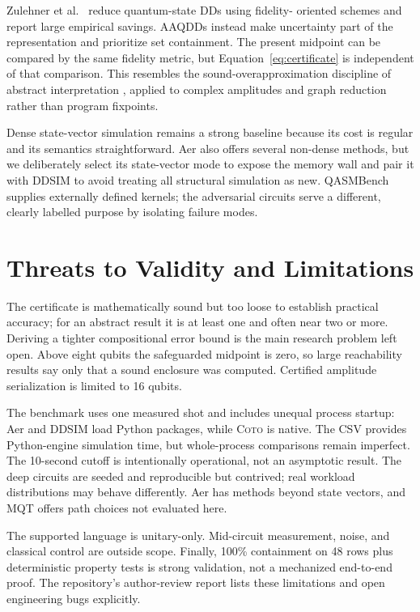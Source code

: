 \documentclass[sigconf,nonacm]{acmart}
\newcommand{\tool}{\textsc{Coto}}
\newcommand{\aaqdd}{AAQDD}
\begin{document}
Zulehner et al.~\cite{zulehner2020approximation} reduce quantum-state DDs using fidelity-
oriented schemes and report large empirical savings. \aaqdd{}s instead make uncertainty part
of the representation and prioritize set containment. The present midpoint can be compared by
the same fidelity metric, but Equation~\ref{eq:certificate} is independent of that comparison.
This resembles the sound-overapproximation discipline of abstract interpretation
\cite{cousot1977abstract}, applied to complex amplitudes and graph reduction rather than
program fixpoints.

Dense state-vector simulation remains a strong baseline because its cost is regular and its
semantics straightforward. Aer also offers several non-dense methods, but we deliberately
select its state-vector mode to expose the memory wall and pair it with DDSIM to avoid treating
all structural simulation as new. QASMBench supplies externally defined kernels; the
adversarial circuits serve a different, clearly labelled purpose by isolating failure modes.

\section{Threats to Validity and Limitations}

The certificate is mathematically sound but too loose to establish practical accuracy; for an
abstract result it is at least one and often near two or more. Deriving a tighter compositional
error bound is the main research problem left open. Above eight qubits the safeguarded midpoint
is zero, so large reachability results say only that a sound enclosure was computed. Certified
amplitude serialization is limited to 16 qubits.

The benchmark uses one measured shot and includes unequal process startup: Aer and DDSIM load
Python packages, while \tool{} is native. The CSV provides Python-engine simulation time, but
whole-process comparisons remain imperfect. The 10-second cutoff is intentionally operational,
not an asymptotic result. The deep circuits are seeded and reproducible but contrived; real
workload distributions may behave differently. Aer has methods beyond state vectors, and MQT
offers path choices not evaluated here.

The supported language is unitary-only. Mid-circuit measurement, noise, and classical control
are outside scope. Finally, 100\% containment on 48 rows plus deterministic property tests is
strong validation, not a mechanized end-to-end proof. The repository's author-review report
lists these limitations and open engineering bugs explicitly.
\end{document}
